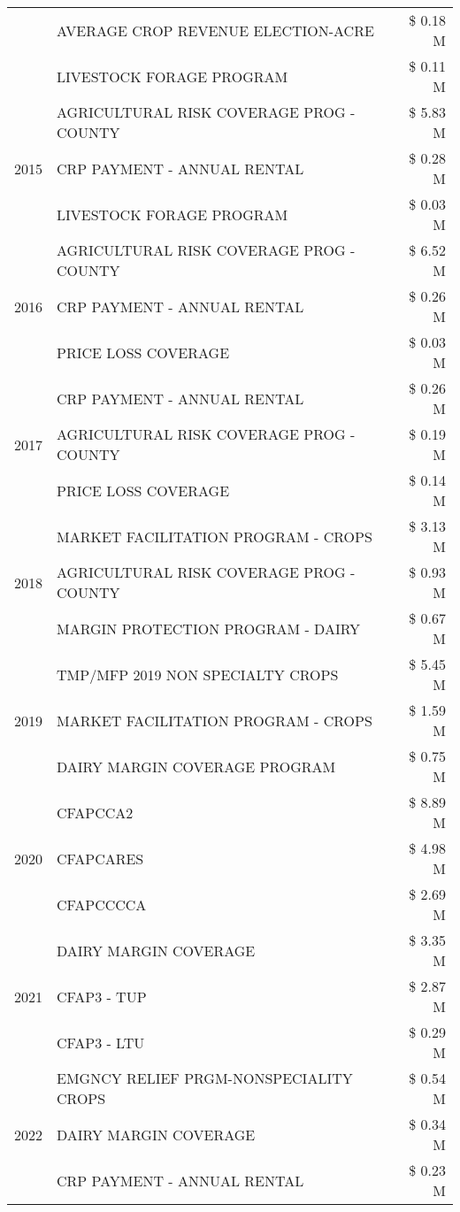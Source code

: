 \begin{tabular}{llr}
 & AVERAGE CROP REVENUE ELECTION-ACRE & \$ 0.18 M \\
 & LIVESTOCK FORAGE PROGRAM & \$ 0.11 M \\
\cline{1-3}
\multirow[t]{3}{*}{2015} & AGRICULTURAL RISK COVERAGE PROG - COUNTY & \$ 5.83 M \\
 & CRP PAYMENT - ANNUAL RENTAL & \$ 0.28 M \\
 & LIVESTOCK FORAGE PROGRAM & \$ 0.03 M \\
\cline{1-3}
\multirow[t]{3}{*}{2016} & AGRICULTURAL RISK COVERAGE PROG - COUNTY & \$ 6.52 M \\
 & CRP PAYMENT - ANNUAL RENTAL & \$ 0.26 M \\
 & PRICE LOSS COVERAGE & \$ 0.03 M \\
\cline{1-3}
\multirow[t]{3}{*}{2017} & CRP PAYMENT - ANNUAL RENTAL & \$ 0.26 M \\
 & AGRICULTURAL RISK COVERAGE PROG - COUNTY & \$ 0.19 M \\
 & PRICE LOSS COVERAGE & \$ 0.14 M \\
\cline{1-3}
\multirow[t]{3}{*}{2018} & MARKET FACILITATION PROGRAM - CROPS & \$ 3.13 M \\
 & AGRICULTURAL RISK COVERAGE PROG - COUNTY & \$ 0.93 M \\
 & MARGIN PROTECTION PROGRAM - DAIRY & \$ 0.67 M \\
\cline{1-3}
\multirow[t]{3}{*}{2019} & TMP/MFP 2019 NON SPECIALTY CROPS & \$ 5.45 M \\
 & MARKET FACILITATION PROGRAM - CROPS & \$ 1.59 M \\
 & DAIRY MARGIN COVERAGE PROGRAM & \$ 0.75 M \\
\cline{1-3}
\multirow[t]{3}{*}{2020} & CFAPCCA2 & \$ 8.89 M \\
 & CFAPCARES & \$ 4.98 M \\
 & CFAPCCCCA & \$ 2.69 M \\
\cline{1-3}
\multirow[t]{3}{*}{2021} & DAIRY MARGIN COVERAGE & \$ 3.35 M \\
 & CFAP3 - TUP & \$ 2.87 M \\
 & CFAP3 - LTU & \$ 0.29 M \\
\cline{1-3}
\multirow[t]{3}{*}{2022} & EMGNCY RELIEF PRGM-NONSPECIALITY CROPS & \$ 0.54 M \\
 & DAIRY MARGIN COVERAGE & \$ 0.34 M \\
 & CRP PAYMENT - ANNUAL RENTAL & \$ 0.23 M \\
\cline{1-3}
\bottomrule
\end{tabular}
